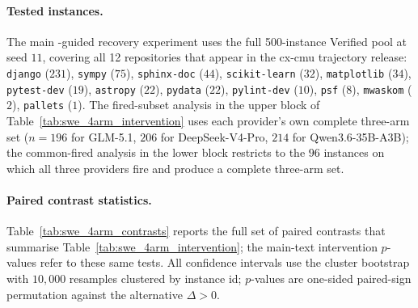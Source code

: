 \paragraph{Tested instances.}
The main \method{}-guided recovery experiment uses the full 500-instance \swe{} Verified pool at seed $11$, covering all 12 \swe{} repositories that appear in the cx-cmu trajectory release: \texttt{django} ($231$), \texttt{sympy} ($75$), \texttt{sphinx-doc} ($44$), \texttt{scikit-learn} ($32$), \texttt{matplotlib} ($34$), \texttt{pytest-dev} ($19$), \texttt{astropy} ($22$), \texttt{pydata} ($22$), \texttt{pylint-dev} ($10$), \texttt{psf} ($8$), \texttt{mwaskom} ($2$), \texttt{pallets} ($1$).
The fired-subset analysis in the upper block of Table~\ref{tab:swe_4arm_intervention} uses each provider's own complete three-arm set ($n{=}196$ for GLM-5.1, $206$ for DeepSeek-V4-Pro, $214$ for Qwen3.6-35B-A3B); the common-fired analysis in the lower block restricts to the $96$ instances on which all three providers fire and produce a complete three-arm set.

\paragraph{Paired contrast statistics.}
Table~\ref{tab:swe_4arm_contrasts} reports the full set of paired contrasts that summarise Table~\ref{tab:swe_4arm_intervention}; the main-text intervention $p$-values refer to these same tests.
All confidence intervals use the cluster bootstrap with $10{,}000$ resamples clustered by instance id; $p$-values are one-sided paired-sign permutation against the alternative $\Delta > 0$.

